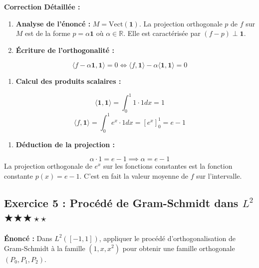 \documentclass[11pt,a4paper]{article}
\begin{document}
\textbf{Correction Détaillée :}
\begin{enumerate}
\item \textbf{Analyse de l'énoncé :} $M = \text{Vect}(\mathbf{1})$. La projection orthogonale $p$ de $f$ sur $M$ est de la forme $p = \alpha \mathbf{1}$ où $\alpha \in \mathbb{R}$. Elle est caractérisée par $(f - p) \perp \mathbf{1}$.

\item \textbf{Écriture de l'orthogonalité :}
\end{enumerate}
   $$ \langle f - \alpha \mathbf{1}, \mathbf{1} \rangle = 0 \iff \langle f, \mathbf{1} \rangle - \alpha \langle \mathbf{1}, \mathbf{1} \rangle = 0 $$
\begin{enumerate}
\item \textbf{Calcul des produits scalaires :}
\end{enumerate}
   $$ \langle \mathbf{1}, \mathbf{1} \rangle = \int_0^1 1 \cdot 1 dx = 1 $$
   $$ \langle f, \mathbf{1} \rangle = \int_0^1 e^x \cdot 1 dx = \left[ e^x \right]_0^1 = e - 1 $$
\begin{enumerate}
\item \textbf{Déduction de la projection :}
\end{enumerate}
   $$ \alpha \cdot 1 = e - 1 \implies \alpha = e - 1 $$
   La projection orthogonale de $e^x$ sur les fonctions constantes est la fonction constante $p(x) = e - 1$. C'est en fait la valeur moyenne de $f$ sur l'intervalle.



\subsection*{Exercice 5 : Procédé de Gram-Schmidt dans $L^2$ \quad $\bigstar\bigstar\bigstar\star\star$}

\textbf{Énoncé :}
Dans $L^2([-1,1])$, appliquer le procédé d'orthogonalisation de Gram-Schmidt à la famille $(1, x, x^2)$ pour obtenir une famille orthogonale $(P_0, P_1, P_2)$.
\end{document}
